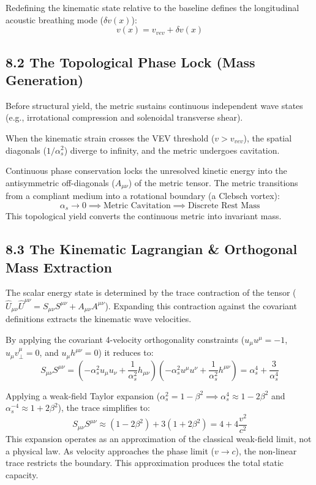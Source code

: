 Redefining the kinematic state relative to the baseline defines the longitudinal acoustic breathing mode ($\delta v(x)$): 
\begin{equation}
    v(x) = v_{vev} + \delta v(x)
\end{equation}



\subsection*{8.2 The Topological Phase Lock (Mass Generation)}
Before structural yield, the metric sustains continuous independent wave states (e.g., irrotational compression and solenoidal transverse shear). 

When the kinematic strain crosses the VEV threshold ($v > v_{vev}$), the spatial diagonals ($1/\alpha_s^2$) diverge to infinity, and the metric undergoes cavitation. 

Continuous phase conservation locks the unresolved kinetic energy into the antisymmetric off-diagonals ($A_{\mu\nu}$) of the metric tensor. The metric transitions from a compliant medium into a rotational boundary (a Clebsch vortex): 
\begin{equation}
    \alpha_s \to 0 \implies \text{Metric Cavitation} \implies \text{Discrete Rest Mass}
\end{equation}
This topological yield converts the continuous metric into invariant mass.

\subsection*{8.3 The Kinematic Lagrangian \& Orthogonal Mass Extraction}
The scalar energy state is determined by the trace contraction of the tensor ($\hat{U}_{\mu\nu} \hat{U}^{\mu\nu} = S_{\mu\nu}S^{\mu\nu} + A_{\mu\nu}A^{\mu\nu}$). Expanding this contraction against the covariant definitions extracts the kinematic wave velocities. 

By applying the covariant 4-velocity orthogonality constraints ($u_\mu u^\mu = -1$, $u_\mu v^\mu_{\perp} = 0$, and $u_\mu h^{\mu\nu} = 0$) it reduces to:
\begin{equation}
    S_{\mu\nu}S^{\mu\nu} = \left(-\alpha_s^2 u_\mu u_\nu + \frac{1}{\alpha_s^2}h_{\mu\nu}\right)\left(-\alpha_s^2 u^\mu u^\nu + \frac{1}{\alpha_s^2}h^{\mu\nu}\right) = \alpha_s^4 + \frac{3}{\alpha_s^4}
\end{equation}

Applying a weak-field Taylor expansion ($\alpha_s^2 = 1 - \beta^2 \implies \alpha_s^4 \approx 1 - 2\beta^2$ and $\alpha_s^{-4} \approx 1 + 2\beta^2$), the trace simplifies to:
\begin{equation}
    S_{\mu\nu}S^{\mu\nu} \approx (1 - 2\beta^2) + 3(1 + 2\beta^2) = 4 + 4\frac{v^2}{c^2}
\end{equation}
This expansion operates as an approximation of the classical weak-field limit, not a physical law. As velocity approaches the phase limit ($v \to c$), the non-linear trace restricts the boundary. This approximation produces the total static capacity. 


